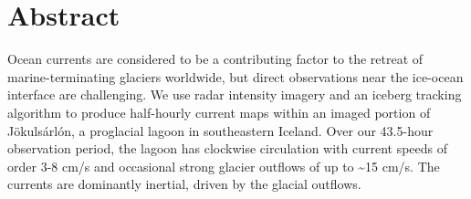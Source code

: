 


% 
% 

\section{Abstract}
Ocean currents are considered to be a contributing factor to the retreat of marine-terminating glaciers worldwide, but direct observations near the ice-ocean interface are challenging. We use radar intensity imagery and an iceberg tracking algorithm to produce half-hourly current maps within an imaged portion of Jökulsárlón, a proglacial lagoon in southeastern Iceland. Over our 43.5-hour observation period, the lagoon has clockwise circulation with current speeds of order 3-8 cm/s and occasional strong glacier outflows of up to \textasciitilde 15 cm/s. The currents are dominantly inertial, driven by the glacial outflows.

% 
% 

